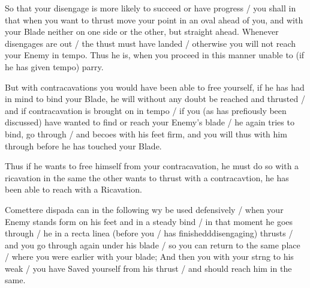 So that your disengage is more likely to succeed or have progress / you
shall in that when you want to thrust move your point in an oval ahead
of you, and with your Blade neither on one side or the other, but
straight ahead. Whenever disengages are out / the thust must have landed /
otherwise you will not reach your Enemy in tempo. Thus he is, when you
proceed in this manner unable to (if he has given tempo)  parry.


But with contracavations you would have been able to free yourself, if
he has had in mind to bind your Blade, he will without any doubt be
reached and thrusted / and if contracavation is brought on in tempo /
if you (as has prefiously been discussed) have wanted to find or reach
your Enemy's blade / he again tries to bind, go through / and becoes
with his feet firm, and you will thus with him through before he has
touched your Blade.


Thus if he wants to free himself from your contracavation, he must do
so with a ricavation in the same the other wants to thrust with a
contracavtion, he has been able to reach with a Ricavation.


Comettere dispada can in the following wy be used defensively / when
your Enemy stands form on his feet and in a steady bind / in that
moment he goes through / he in a recta linea (before you / has
finishedddisengaging) thrusts / and you go through again under his blade /
so you can return to the same place / where you were earlier with your
blade; And then you with your strng to his weak / you have Saved
yourself from his thrust / and should reach him in the same.

